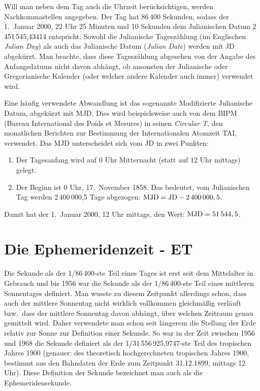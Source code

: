 Will man neben dem Tag auch die Uhrzeit ber\"ucksichtigen, werden Nachkommastellen angegeben.
Der Tag hat 86\,400 Sekunden, sodass der 1.\ Januar 2000, 22 Uhr 25 Minuten und 10 Sekunden dem
Julianischen Datum 2\,451\,545,43414 entspricht. Sowohl die Julianische Tagesz\"ahlung (im Englischen
\textit{Julian Day}) als auch das  
Julianische Datum (\textit{Julian Date}) werden mit JD abgek\"urzt. 
Man beachte, dass diese Tagesz\"ahlung abgesehen von der Angabe des Anfangsdatums
nicht davon abh\"angt, ob ansonsten der Julianische oder Gregorianische Kalender (oder welcher andere 
Kalender auch immer) verwendet wird. 

Eine h\"aufig verwendete Abwandlung ist das sogenannte 
Modifizierte Julianische Datum, abgek\"urzt mit
MJD. Dies wird beispielsweise auch von dem BIPM (Bureau International des Poids et Mesures) in seinen
\textit{Circular T}, 
den monatlichen Berichten zur Bestimmung der Internationalen Atomzeit TAI,
verwendet. Das MJD unterscheidet sich vom JD in zwei Punkten:
\begin{enumerate}
\item
Der Tagesanfang wird auf 0 Uhr Mitternacht (statt auf 12 Uhr mittags) gelegt.
\item  
Der Beginn ist 0 Uhr, 17.\ November 1858. Das bedeutet, vom Julianischen Tag werden 2\,400\,000,5 Tage
abgezogen: ${\rm MJD=JD}-2\,400\,000,5$.       
\end{enumerate}
Damit hat der 1.\ Januar 2000, 12 Uhr mittags, den Wert: ${\rm MJD}= 51\,544,5$.  

\section{Die Ephemeridenzeit - ET}

Die 
Sekunde als der 1/86\,400-ste Teil eines Tages ist erst seit dem Mittelalter in Gebrauch
und bis 1956 war die Sekunde als der 1/86\,400-ste Teil eines mittleren Sonnentages definiert. 
Man wusste zu diesem Zeitpunkt allerdings schon, dass auch der mittlere Sonnentag nicht wirklich
vollkommen gleichm\"a\ss ig verl\"auft bzw.\ dass der mittlere Sonnentag davon abh\"angt, \"uber
welchen Zeitraum genau gemittelt wird. Daher verwendete man schon seit l\"angerem die Stellung
der Erde relativ zur Sonne zur Definition einer Sekunde. So war in der Zeit zwischen 1956 und 1968
die Sekunde definiert als der 1/31\,556\,925,9747-ste Teil des tropischen Jahres 1900 
(genauer: des theoretisch hochgerechneten tropischen
Jahres 1900, bestimmt aus den Bahndaten der Erde zum Zeitpunkt 31.12.1899, mittags 12 Uhr).
Diese Definition der Sekunde bezeichnet man auch als die 
Ephemeridensekunde.

